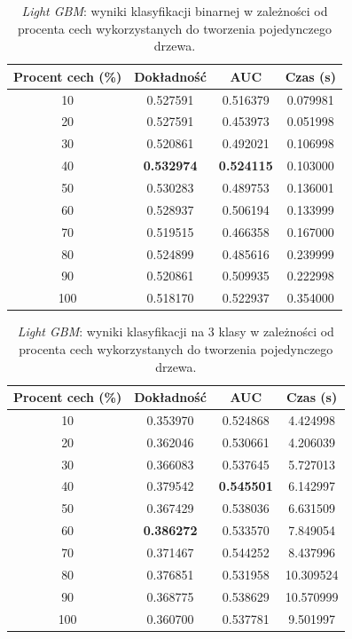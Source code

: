 \documentclass[a4paper, twoside, 11pt, openright]{article}
\begin{document}
\begin{table}[H]
    \centering
    \begin{tabular}{|c|c|c|c|}
    \hline
        \textbf{Procent cech (\%)} & \textbf{Dokładność} & \textbf{AUC} & \textbf{Czas (s)} \\ \hline
10              &  0.527591 &  0.516379 &    0.079981 \\
20              &  0.527591 &  0.453973 &    0.051998 \\
30              &  0.520861 &  0.492021 &    0.106998 \\
40              &  \textbf{0.532974} &  \textbf{0.524115} &    0.103000 \\
50              &  0.530283 &  0.489753 &    0.136001 \\
60              &  0.528937 &  0.506194 &    0.133999 \\
70              &  0.519515 &  0.466358 &    0.167000 \\
80              &  0.524899 &  0.485616 &    0.239999 \\
90              &  0.520861 &  0.509935 &    0.222998 \\
100              &  0.518170 &  0.522937 &    0.354000 \\ \hline
    \end{tabular}
    \caption{\textit{Light GBM}: wyniki klasyfikacji binarnej w zależności od procenta cech wykorzystanych do tworzenia pojedynczego drzewa.}
    \label{tab:lgbm_feature_fraction_binary}
\end{table}

\begin{table}[H]
    \centering
    \begin{tabular}{|c|c|c|c|}
    \hline
        \textbf{Procent cech (\%)} & \textbf{Dokładność} & \textbf{AUC} & \textbf{Czas (s)} \\ \hline
10              &  0.353970 &  0.524868 &    4.424998 \\
20              &  0.362046 &  0.530661 &    4.206039 \\
30              &  0.366083 &  0.537645 &    5.727013 \\
40              &  0.379542 &  \textbf{0.545501} &    6.142997 \\
50              &  0.367429 &  0.538036 &    6.631509 \\
60              &  \textbf{0.386272} &  0.533570 &    7.849054 \\
70              &  0.371467 &  0.544252 &    8.437996 \\
80              &  0.376851 &  0.531958 &   10.309524 \\
90             &  0.368775 &  0.538629 &   10.570999 \\
100              &  0.360700 &  0.537781 &    9.501997 \\ \hline
    \end{tabular}
    \caption{\textit{Light GBM}: wyniki klasyfikacji na 3 klasy w zależności od procenta cech wykorzystanych do tworzenia pojedynczego drzewa.}
    \label{tab:lgbm_feature_fraction_discrete}
\end{table}
\end{document}

